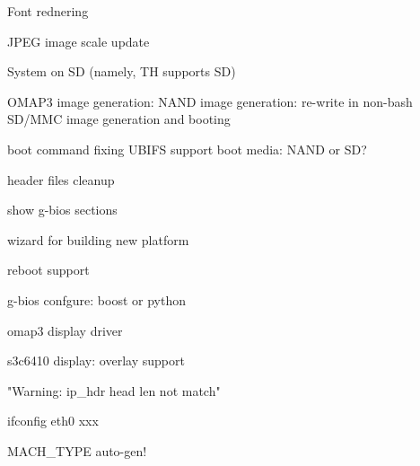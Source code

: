 Font rednering

JPEG image
	scale
	update

System on SD (namely, TH supports SD)

OMAP3 image generation:
	NAND image generation: re-write in non-bash
	SD/MMC image generation and booting

boot command fixing
	UBIFS support
	boot media: NAND or SD?

header files cleanup

show g-bios sections

wizard for building new platform

reboot support

g-bios confgure: boost or python

omap3 display driver

s3c6410 display: overlay support

"Warning: ip_hdr head len not match"

ifconfig eth0 xxx

MACH_TYPE auto-gen!
